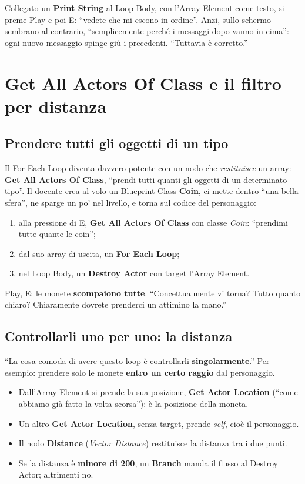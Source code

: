 Collegato un \textbf{Print String} al Loop Body, con l'Array Element come
testo, si preme Play e poi E: ``vedete che mi escono in ordine''. Anzi, sullo
schermo sembrano al contrario, ``semplicemente perché i messaggi dopo vanno in
cima'': ogni nuovo messaggio spinge giù i precedenti. ``Tuttavia è corretto.''

\section{Get All Actors Of Class e il filtro per distanza}
\label{gd12:sec:get-all}

\subsection{Prendere tutti gli oggetti di un tipo}

Il For Each Loop diventa davvero potente con un nodo che \emph{restituisce} un
array: \textbf{Get All Actors Of Class}, ``prendi tutti quanti gli oggetti di un
determinato tipo''. Il docente crea al volo un Blueprint Class
\textbf{Coin}, ci mette dentro ``una bella sfera'', ne sparge un po' nel
livello, e torna sul codice del personaggio:
\begin{enumerate}
  \item alla pressione di E, \textbf{Get All Actors Of Class} con classe
        \emph{Coin}: ``prendimi tutte quante le coin'';
  \item dal suo array di uscita, un \textbf{For Each Loop};
  \item nel Loop Body, un \textbf{Destroy Actor} con target l'Array Element.
\end{enumerate}
Play, E: le monete \textbf{scompaiono tutte}. ``Concettualmente vi torna? Tutto
quanto chiaro? Chiaramente dovrete prenderci un attimino la mano.''

\subsection{Controllarli uno per uno: la distanza}

``La cosa comoda di avere questo loop è controllarli \textbf{singolarmente}.''
Per esempio: prendere solo le monete \textbf{entro un certo raggio} dal
personaggio.
\begin{itemize}
  \item Dall'Array Element si prende la sua posizione, \textbf{Get Actor
        Location} (``come abbiamo già fatto la volta scorsa''): è la posizione
        della moneta.
  \item Un altro \textbf{Get Actor Location}, senza target, prende
        \emph{self}, cioè il personaggio.
  \item Il nodo \textbf{Distance} (\emph{Vector Distance}) restituisce la
        distanza tra i due punti.
  \item Se la distanza è \textbf{minore di 200}, un \textbf{Branch} manda il
        flusso al Destroy Actor; altrimenti no.
\end{itemize}

